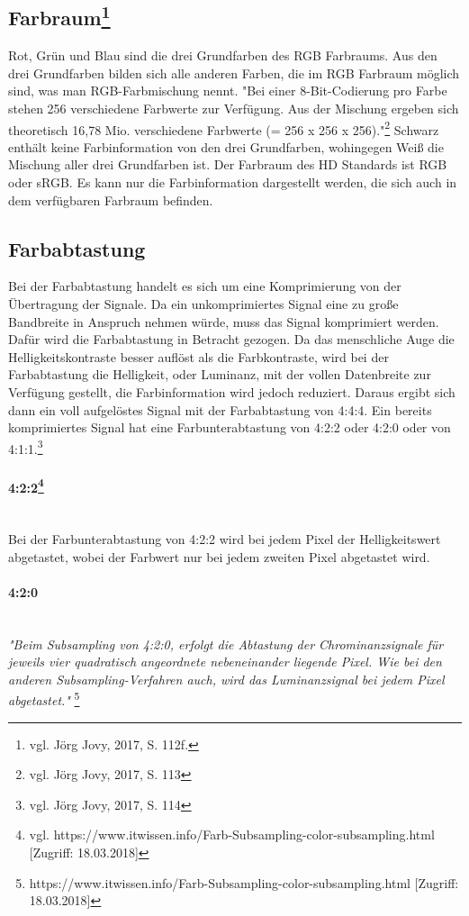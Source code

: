 \subsection[Farbraum]{Farbraum\protect\footnote{\label{}vgl. Jörg Jovy, 2017, S. 112f.}}
Rot, Grün und Blau sind die drei Grundfarben des RGB Farbraums. Aus den drei Grundfarben bilden sich alle anderen Farben, die im RGB Farbraum möglich sind, was man RGB-Farbmischung nennt. "Bei einer 8-Bit-Codierung pro Farbe stehen 256 verschiedene Farbwerte zur Verfügung. Aus der Mischung ergeben sich theoretisch 16,78 Mio. verschiedene Farbwerte (= 256 x 256 x 256)."\footnote{\label{}vgl. Jörg Jovy, 2017, S. 113} Schwarz enthält keine Farbinformation von den drei Grundfarben, wohingegen Weiß die Mischung aller drei Grundfarben ist. Der Farbraum des HD Standards ist RGB oder sRGB. Es kann nur die Farbinformation dargestellt werden, die sich auch in dem verfügbaren Farbraum befinden. 
\subsection{Farbabtastung}
Bei der Farbabtastung handelt es sich um eine Komprimierung von  der Übertragung der Signale. Da ein unkomprimiertes Signal eine zu große Bandbreite in Anspruch nehmen würde, muss das Signal komprimiert werden. Dafür wird die Farbabtastung in Betracht gezogen. Da das menschliche Auge die Helligkeitskontraste besser auflöst als die Farbkontraste, wird bei der Farbabtastung die Helligkeit, oder Luminanz, mit der vollen Datenbreite zur Verfügung gestellt, die Farbinformation wird jedoch reduziert. Daraus ergibt sich dann ein voll aufgelöstes Signal mit der Farbabtastung von 4:4:4. Ein bereits komprimiertes Signal hat eine Farbunterabtastung von 4:2:2 oder 4:2:0 oder von 4:1:1.\footnote{\label{}vgl. Jörg Jovy, 2017, S. 114}
\paragraph[4:2:2]{4:2:2\protect\footnote{\label{}vgl. https://www.itwissen.info/Farb-Subsampling-color-subsampling.html [Zugriff: 18.03.2018]}}
\leavevmode \\
Bei der Farbunterabtastung von 4:2:2 wird bei jedem Pixel der Helligkeitswert abgetastet, wobei der Farbwert nur bei jedem zweiten Pixel abgetastet wird. 
\paragraph{4:2:0}
\leavevmode \\
\textit{"Beim Subsampling von 4:2:0, erfolgt die Abtastung der Chrominanzsignale für jeweils vier quadratisch angeordnete nebeneinander liegende Pixel. Wie bei den anderen Subsampling-Verfahren auch, wird das Luminanzsignal bei jedem Pixel abgetastet."} \footnote{\label{}https://www.itwissen.info/Farb-Subsampling-color-subsampling.html [Zugriff: 18.03.2018]}
